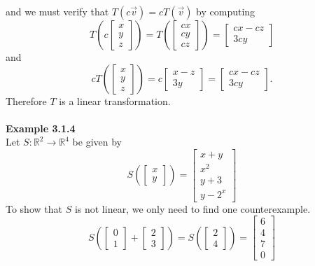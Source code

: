 \documentclass{article}
\begin{document}
and we must verify that $T(c\vec{v}) = cT(\vec{v})$ by computing\\
\begin{equation*}
T\left(c\left[\begin{array}{c} x \\ y \\ z \end{array}\right] \right)
=
T\left(\left[\begin{array}{c} cx \\ cy \\ cz \end{array}\right] \right)
=
\left[\begin{array}{c} cx-cz \\ 3cy \end{array}\right]
\end{equation*} and 
\begin{equation*}
cT\left(\left[\begin{array}{c} x \\ y \\ z \end{array}\right] \right)
=
c\left[\begin{array}{c} x-z \\ 3y \end{array}\right]
=
\left[\begin{array}{c} cx-cz \\ 3cy \end{array}\right]\text{.}
\end{equation*} 
Therefore $T$ is a linear transformation.\\
\\
\noindent \textbf{Example 3.1.4} \\
Let $S : \mathbb{R}^{2} \rightarrow \mathbb{R}^{4}$ be given by \begin{equation*}
S\left(\left[\begin{array}{c} x \\ y \end{array}\right] \right)
=
\left[\begin{array}{c} x+y \\ x^2 \\ y+3 \\ y-2^x \end{array}\right]
\end{equation*} To show that $S$ is not linear, we only need to find one counterexample.
\begin{equation*}
S\left(
\left[\begin{array}{c} 0 \\ 1 \end{array}\right] +
\left[\begin{array}{c} 2 \\ 3 \end{array}\right]
\right)
=
S\left(
\left[\begin{array}{c} 2 \\ 4 \end{array}\right]
\right) =
\left[\begin{array}{c} 6 \\ 4 \\ 7 \\ 0 \end{array}\right]
\end{equation*}
\end{document}
